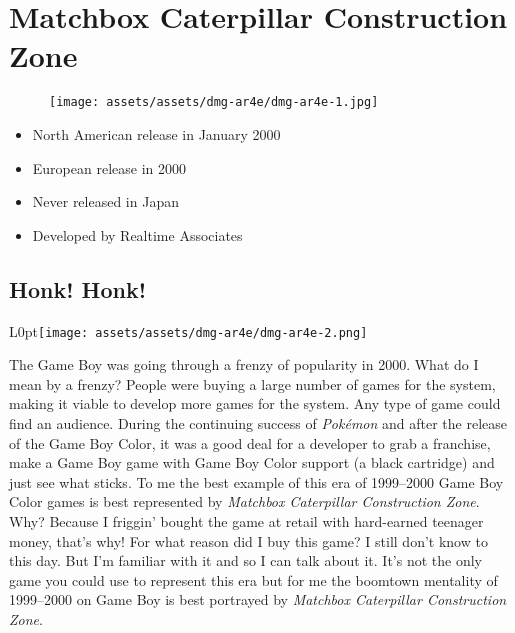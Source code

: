 \documentclass{book}
\begin{document}
\chapter*{Matchbox Caterpillar Construction Zone}
\vspace{\baselineskip}\begin{figure}[H]{\texttt{[image: assets/assets/dmg-ar4e/dmg-ar4e-1.jpg]}}\end{figure}\vspace{\baselineskip}
\begin{itemize}[left=0pt, nosep]
\item North American release in January 2000
\item European release in 2000
\item Never released in Japan
\item Developed by Realtime Associates

\end{itemize}
\newpage\FloatBarrier\section*{Honk! Honk!}
\begin{wrapfigure}{L}{0pt}{\texttt{[image: assets/assets/dmg-ar4e/dmg-ar4e-2.png]}}\end{wrapfigure}\noindent
The Game Boy was going through a frenzy of popularity in 2000. What do I mean by a frenzy? People were buying a large number of games for the system, making it viable to develop more games for the system. Any type of game could find an audience. During the continuing success of \emph{Pokémon} and after the release of the Game Boy Color, it was a good deal for a developer to grab a franchise, make a Game Boy game with Game Boy Color support (a black cartridge) and just see what sticks. To me the best example of this era of 1999–2000 Game Boy Color games is best represented by \emph{Matchbox Caterpillar Construction Zone}. Why? Because I friggin’ bought the game at retail with hard-earned teenager money, that’s why! For what reason did I buy this game? I still don’t know to this day. But I’m familiar with it and so I can talk about it. It’s not the only game you could use to represent this era but for me the boomtown mentality of 1999–2000 on Game Boy is best portrayed by \emph{Matchbox Caterpillar Construction Zone}.\par
\end{document}
